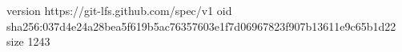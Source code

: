 version https://git-lfs.github.com/spec/v1
oid sha256:037d4e24a28bea5f619b5ac76357603e1f7d06967823f907b13611e9c65b1d22
size 1243
